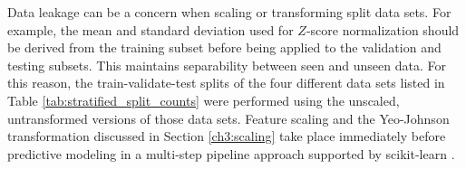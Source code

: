 Data leakage can be a concern when scaling or transforming split data sets. For example, the mean and standard deviation used for $Z$-score normalization should be derived from the training subset before being applied to the validation and testing subsets. This maintains separability between seen and unseen data. For this reason, the train-validate-test splits of the four different data sets listed in Table \ref{tab:stratified_split_counts} were performed using the unscaled, untransformed versions of those data sets. Feature scaling and the Yeo-Johnson transformation discussed in Section \ref{ch3:scaling} take place immediately before predictive modeling in a multi-step pipeline approach supported by scikit-learn \citep[see][]{scikit-learn_pipelines_2021}.
\\
\begin{table}%
\end{table}
